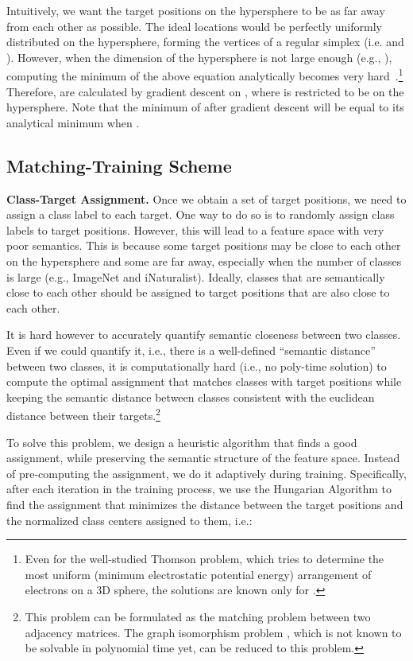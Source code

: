 \documentclass[10pt,twocolumn,letterpaper]{article}
\begin{document}
Intuitively, we want the target positions on the hypersphere to be as far away from each other as possible. The ideal locations would be perfectly uniformly distributed on the hypersphere, forming the vertices of a regular simplex (i.e.  and )\cite{graf2021dissecting}. 
However, when the dimension of the hypersphere is not large enough (e.g., ), computing the minimum of the above equation analytically becomes very hard~\cite{graf2021dissecting}.\footnote{Even for the well-studied Thomson problem, which tries to determine the most uniform (minimum electrostatic potential energy) arrangement of  electrons on a 3D sphere, the solutions are known only for .} Therefore,  are calculated by gradient descent on , where  is restricted to be on the hypersphere. Note that the minimum of  after gradient descent will be equal to its analytical minimum when .






\subsection{Matching-Training Scheme}

\noindent\textbf{Class-Target Assignment.} Once we obtain a set of target positions, we need to assign a class label to each target. One way to do so is to randomly assign class labels to target positions. However, this will lead to a feature space with very poor semantics. This is because some target positions may be close to each other on the hypersphere and some are far away, especially when the number of classes is large (e.g., ImageNet and iNaturalist). Ideally, classes that are semantically close to each other should be assigned to target positions that are also close to each other.

It is hard however to accurately quantify semantic closeness between two classes. Even if we could quantify it, i.e., there is a well-defined ``semantic distance'' between two classes, it is computationally hard (i.e., no poly-time solution)
to compute the optimal assignment that matches classes with target positions while keeping the semantic distance between classes consistent with the euclidean distance between their targets.\footnote{This problem can be formulated as the matching problem between two adjacency matrices. The graph isomorphism problem \cite{fortin1996graph}, which is not known to be solvable in polynomial time yet, can be reduced to this problem.} 

To solve this problem, we design a heuristic algorithm that finds a good assignment, while preserving the semantic structure of the feature space. Instead of pre-computing the assignment, we do it adaptively during training. Specifically,  
after each iteration in the training process, we use the Hungarian Algorithm \cite{kuhn1955hungarian} to find the assignment   that minimizes the distance between the target positions and the normalized class centers assigned to them, i.e.:
\end{document}
